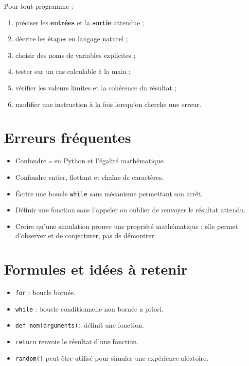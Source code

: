 Pour tout programme :

\begin{enumerate}
\item préciser les \textbf{entrées} et la \textbf{sortie} attendue ;
\item décrire les étapes en langage naturel ;
\item choisir des noms de variables explicites ;
\item tester sur un cas calculable à la main ;
\item vérifier les valeurs limites et la cohérence du résultat ;
\item modifier une instruction à la fois lorsqu'on cherche une erreur.
\end{enumerate}


\section{Erreurs fréquentes}

\begin{itemize}
\item Confondre \texttt{=} en Python et l'égalité mathématique.
\item Confondre entier, flottant et chaîne de caractères.
\item Écrire une boucle \texttt{while} sans mécanisme permettant son arrêt.
\item Définir une fonction sans l'appeler ou oublier de renvoyer le résultat attendu.
\item Croire qu'une simulation prouve une propriété mathématique : elle permet d'observer et de conjecturer, pas de démontrer.
\end{itemize}

\section{Formules et idées à retenir}

\begin{itemize}
\item \texttt{for} : boucle bornée.
\item \texttt{while} : boucle conditionnelle non bornée a priori.
\item \texttt{def nom(arguments):} définit une fonction.
\item \texttt{return} renvoie le résultat d'une fonction.
\item \texttt{random()} peut être utilisé pour simuler une expérience aléatoire.
\end{itemize}

